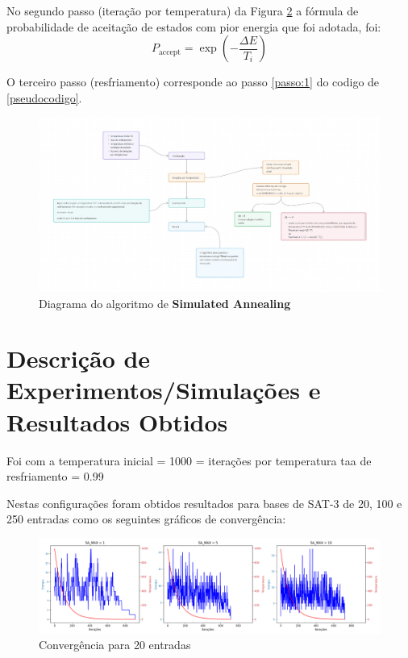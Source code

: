 \documentclass[12pt]{article}
\begin{document}
No segundo passo (iteração por temperatura) da Figura \ref{fig:metodologia} a fórmula de probabilidade de aceitação de estados com pior energia que foi adotada, foi:
\begin{equation}
  P_{\text{accept}} = \exp\left(-\frac{\Delta E}{T_i}\right)
\end{equation}

O terceiro passo (resfriamento) corresponde ao passo \ref{passo:1} do codigo de \ref{pseudocodigo}.

\begin{figure}[H]
  \centering
  \includegraphics[width=1\textwidth]{pasta_.jpeg}
  \caption{Diagrama do algoritmo de \textbf{Simulated Annealing}}
  \label{fig:metodologia}
  \end{figure}

\section{Descrição de Experimentos/Simulações e Resultados Obtidos}
\label{sec:descicao_de_experimentos_/_simulacoes_e_resultados_obtidos}


Foi com a temperatura inicial = 1000 = iterações por temperatura taa de resfriamento = 0.99 


Nestas configurações foram obtidos resultados para bases de SAT-3 de 20, 100 e 250 entradas como os seguintes gráficos de convergência:%

\begin{figure}[H]
  \centering
  \includegraphics[width=.9\textwidth]{../../melhores_sa_20.png}
  \caption{Convergência para 20 entradas}
  \label{fig:metodologia}
  \end{figure}
\end{document}
